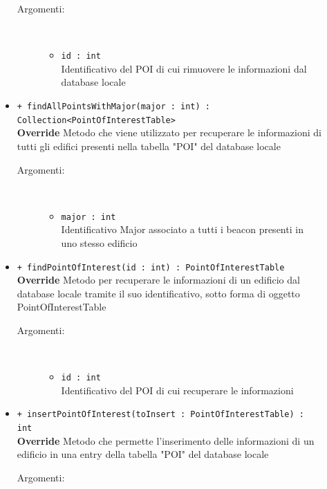 \documentclass[../DefinizioneDiProdotto.tex]{subfiles}
\begin{document}
\begin{description}
\begin{itemize}
		\begin{description}
			\item[Argomenti:] \
			\begin{itemize}
				\item \texttt{id : int}\\
				Identificativo del POI di cui rimuovere le informazioni dal database locale\end{itemize}
		\end{description}
		\item \texttt{+ findAllPointsWithMajor(major : int) :\\ Collection<PointOfInterestTable>}\\
		\textbf{Override} Metodo che viene utilizzato per recuperare le informazioni di tutti gli edifici presenti nella tabella "POI" del database locale
		\begin{description}
			\item[Argomenti:] \
			\begin{itemize}
				\item \texttt{major : int}\\
				Identificativo Major associato a tutti i beacon presenti in uno stesso edificio\end{itemize}
		\end{description}
		\item \texttt{+ findPointOfInterest(id : int) : PointOfInterestTable}\\
		\textbf{Override} Metodo per recuperare le informazioni di un edificio dal database locale tramite il suo identificativo, sotto forma di oggetto PointOfInterestTable
		\begin{description}
			\item[Argomenti:] \
			\begin{itemize}
				\item \texttt{id : int}\\
				Identificativo del POI di cui recuperare le informazioni\end{itemize}
		\end{description}
		\item \texttt{+ insertPointOfInterest(toInsert : PointOfInterestTable) : int}\\
		\textbf{Override} Metodo che permette l'inserimento delle informazioni di un edificio in una entry della tabella "POI" del database locale
		\begin{description}
			\item[Argomenti:] \
			\begin{itemize}

\end{itemize}
\end{description}
\end{itemize}
\end{description}
\end{document}
